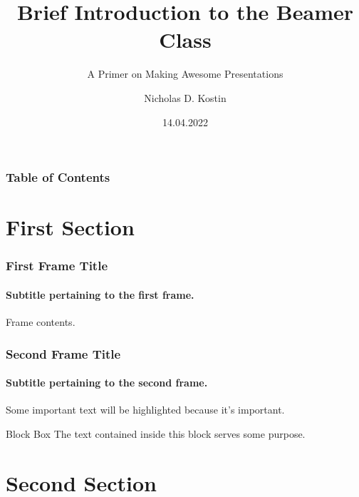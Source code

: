 \documentclass[aspectratio=169]{beamer}
\title{Brief Introduction to the Beamer Class}
\subtitle{A Primer on Making Awesome Presentations}
\author{Nicholas D. Kostin}
\date{14.04.2022}
\numberwithin{equation}{section}
\begin{document}
\frame{\titlepage}

\begin{frame}
    \frametitle{Table of Contents}
    \tableofcontents
\end{frame}

\section{First Section}

\begin{frame}
\frametitle{First Frame Title}
\framesubtitle{Subtitle pertaining to the first frame.}

Frame contents.

\end{frame}

\begin{frame}
\frametitle{Second Frame Title}
\framesubtitle{Subtitle pertaining to the second frame.}

Some important text will be \alert{highlighted} because it's important.

\vfill

\begin{block}{Block Box}
    The text contained inside this block serves some purpose.
\end{block}

\end{frame}

\section{Second Section}
\end{document}
